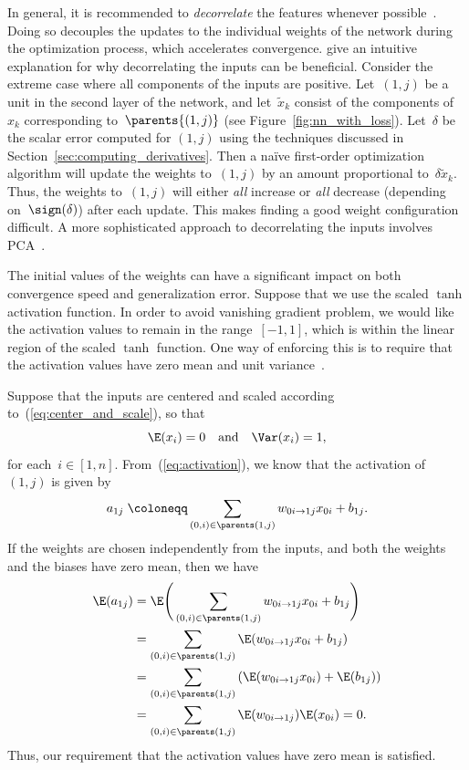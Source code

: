 \documentclass[11pt,a4paper]{article}
\numberwithin{equation}{section}
\newcommand{\weight}[2]{w_{#1 \rightarrow #2}}
\begin{document}
In general, it is recommended to \emph{decorrelate} the features whenever
possible~\citep{lecun-98b}. Doing so decouples the updates to the individual
weights of the network during the optimization process, which accelerates
convergence. \citet{lecun-98b} give an intuitive explanation for why
decorrelating the inputs can be beneficial. Consider the extreme case where all
components of the inputs are positive. Let~$(1, j)$ be a unit in the second
layer of the network, and let~$\tilde{x}_k$ consist of the components of~$x_k$
corresponding to~$\parents{(1, j)}$ (see Figure~\ref{fig:nn_with_loss}).
Let~$\delta$ be the scalar error computed for $(1, j)$ using the techniques
discussed in Section~\ref{sec:computing_derivatives}. Then a na\"{i}ve
first-order optimization algorithm will update the weights to~$(1, j)$ by an
amount proportional to~$\delta \tilde{x}_k$. Thus, the weights to~$(1, j)$ will
either \emph{all} increase or \emph{all} decrease (depending on~$\sign(\delta)$)
after each update. This makes finding a good weight configuration difficult. A
more sophisticated approach to decorrelating the inputs involves
PCA~\citep{lecun-98b, krizhevsky2012imagenet}.

The initial values of the weights can have a significant impact on both
convergence speed and generalization error. Suppose that we use the scaled
$\tanh$ activation function. In order to avoid vanishing gradient problem, we
would like the activation values to remain in the range~$[-1, 1]$, which is
within the linear region of the scaled $\tanh$ function. One way of enforcing
this is to require that the activation values have zero mean and unit
variance~\citep{lecun-98b}.

Suppose that the inputs are centered and scaled according
to~(\ref{eq:center_and_scale}), so that
\[
	\E(x_i) = 0 \quad\text{and}\quad \Var(x_i) = 1,
\]
for each~$i \in [1, n]$. From~(\ref{eq:activation}), we know that the activation
of~$(1, j)$ is given by
\[
	a_{1j} \;\coloneqq \sum_{(0, i) \in \parents(1, j)} \weight{0i}{1j} x_{0i} + b_{1j}.
\]
If the weights are chosen independently from the inputs, and both the weights
and the biases have zero mean, then we have
\begin{align*}
	\E(a_{1j})
	&= \E\Bigg(\sum_{(0, i) \in \parents(1, j)} \weight{0i}{1j} x_{0i} + b_{1j}\Bigg) \\
	&= \sum_{(0, i) \in \parents(1, j)} \E(\weight{0i}{1j} x_{0i} + b_{1j}) \\
	&= \sum_{(0, i) \in \parents(1, j)} \left(\E(\weight{0i}{1j} x_{0i}) + \E(b_{1j})\right) \\
	&= \sum_{(0, i) \in \parents(1, j)} \E(\weight{0i}{1j}) \E(x_{0i}) = 0.
\end{align*}
Thus, our requirement that the activation values have zero mean is satisfied.
\end{document}
